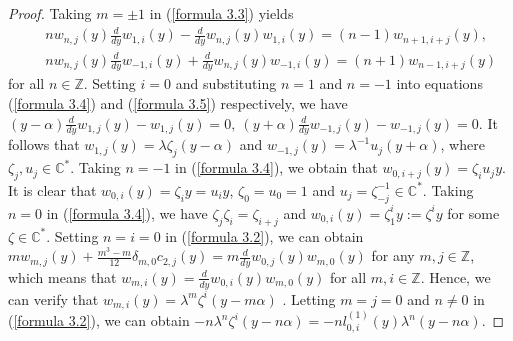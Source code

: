 \documentclass[12pt,reqno]{amsart}
\def\Z{\mathbb{Z}}
\def\C{\mathbb{C}}
\numberwithin{equation}{section}
\begin{document}
\begin{proof}
Taking $m=\pm1$ in (\ref{formula 3.3}) yields
\begin{eqnarray}
    &&nw_{n,j}(y)\frac{d}{d{y}}{w_{1,i}(y)}-\frac{d}{d{y}}{w_{n,j}(y)}w_{1,i}(y)=(n-1)w_{n+1,i+j}(y),\label{formula 3.4} \\
    &&nw_{n,j}(y)\frac{d}{d{y}}{w_{-1,i}(y)}+\frac{d}{d{y}}{w_{n,j}(y)}w_{-1,i}(y)=(n+1)w_{n-1,i+j}(y) \label{formula 3.5}
\end{eqnarray}
for all $n\in\Z$. Setting $i=0$ and substituting $n= 1$ and $n=-1$ into equations (\ref{formula 3.4}) and (\ref{formula 3.5}) respectively, we have $(y-\alpha)\frac{d}{dy}w_{1,j}(y)-w_{1,j}(y)=0,\ (y+\alpha)\frac{d}{dy}w_{-1,j}(y)-w_{-1,j}(y)=0.$
It follows that $w_{1,j}(y)=\lambda\zeta_j(y-\alpha)$ and $w_{-1,j}(y)=\lambda^{-1}u_{j}(y+\alpha)$, where $\zeta_j,u_{j}\in\C^*$. Taking $n=-1$ in (\ref{formula 3.4}), we obtain that $w_{0,i+j}(y)=\zeta_i u_jy.$
  It is clear that  $w_{0,i}(y)=\zeta_i y=u_i y$, $\zeta_0=u_0=1$ and $u_j=\zeta_{-j}^{-1}\in\C^*$. Taking $n=0 $ in (\ref{formula 3.4}), we have $\zeta_j\zeta_i=\zeta_{i+j}$ and $w_{0,i}(y)=\zeta_1^iy:=\zeta^iy$ for some $\zeta\in\C^*$. 
  Setting $n=i=0$ in (\ref{formula 3.2}), we can obtain $mw_{m,j}(y)+\frac{m^3-m}{12}\delta_{m,0}c_{2,j}(y)
=m\frac{d}{d{y}}w_{0,j}(y)w_{m,0}(y)$
for any $m,j\in\Z$,  which means that $w_{m,i}(y)=\frac{d}{dy}{w_{0,i}(y)}w_{m,0}(y)$
   for all $m,i\in\Z$.
  Hence, we can verify that $w_{m,i}(y)=\lambda^m\zeta^i(y-m\alpha)$ .
  Letting $m=j=0$ and $n\neq 0$ in (\ref{formula 3.2}), we can obtain
  $-n\lambda^n\zeta^i(y-n\alpha)=-nl_{0,i}^{(1)}(y)\lambda^n(y-n\alpha).$

\end{proof}
\end{document}
